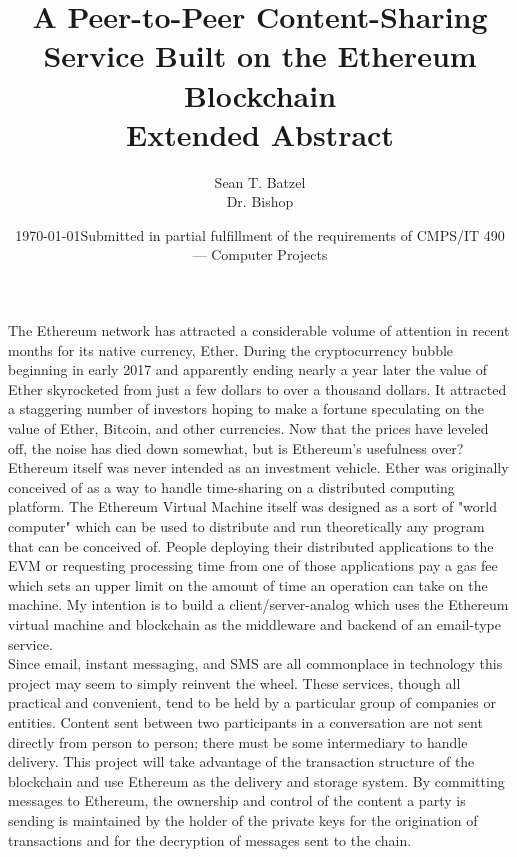 \documentclass[titlepage]{report}
\title{A Peer-to-Peer Content-Sharing Service Built on the Ethereum Blockchain\\\large Extended Abstract}
\author{Sean T. Batzel\\Dr. Bishop}
\date{\today\endgraf\bigskip Submitted in partial fulfillment of the requirements of CMPS/IT 490 --- Computer Projects}
\begin{document}
\maketitle

\nocite{*}

The Ethereum network has attracted a considerable volume of attention in recent months for its native currency, Ether.\cite{ethereum} During the cryptocurrency bubble beginning in early 2017 and apparently ending nearly a year later the value of Ether skyrocketed from just a few dollars to over a thousand dollars. It attracted a staggering number of investors hoping to make a fortune speculating on the value of Ether, Bitcoin, and other currencies. Now that the prices have leveled off, the noise has died down somewhat, but is Ethereum's usefulness over? Ethereum itself was never intended as an investment vehicle. Ether was originally conceived of as a way to handle time-sharing on a distributed computing platform. The Ethereum Virtual Machine itself was designed as a sort of "world computer" which can be used to distribute and run theoretically any program that can be conceived of. People deploying their distributed applications to the EVM or requesting processing time from one of those applications pay a \gls{gas} fee which sets an upper limit on the amount of time an operation can take on the machine.\cite{yellowpaper} My intention is to build a client/server-analog which uses the Ethereum virtual machine and \gls{blockchain} as the middleware and backend of an email-type service.\\

Since email, instant messaging, and SMS are all commonplace in technology this project may seem to simply reinvent the wheel. These services, though all practical and convenient, tend to be held by a particular group of companies or entities. Content sent between two participants in a conversation are not sent directly from person to person; there must be some intermediary to handle delivery. This project will take advantage of the transaction structure of the blockchain and use Ethereum as the delivery and storage system. By committing messages to Ethereum, the ownership and control of the content a party is sending is maintained by the holder of the private keys for the origination of transactions and for the decryption of messages sent to the chain.\\
\end{document}

